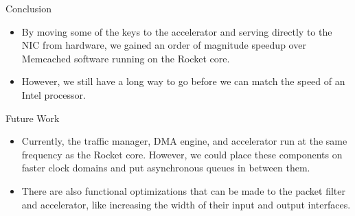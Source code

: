 \begin{block}{Conclusion}

\begin{itemize}
    \item By moving some of the keys to the accelerator and serving directly
        to the NIC from hardware, we gained an order of magnitude speedup
        over Memcached software running on the Rocket core.
    \item However, we still have a long way to go before we can match the
        speed of an Intel processor.
\end{itemize}

\end{block}

\vspace{1ex}

\begin{block}{Future Work}

\begin{itemize}
    \item Currently, the traffic manager, DMA engine, and accelerator run at the
        same frequency as the Rocket core. However, we could place these
        components on faster clock domains and put asynchronous queues in
        between them.
    \item There are also functional optimizations that can be made to the
        packet filter and accelerator, like increasing the width of their
        input and output interfaces.
\end{itemize}

\end{block}
